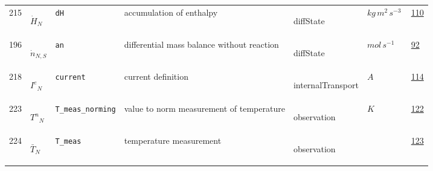 \begin{longtable}{|p{1cm}|p{2.5cm}|p{4.5cm}|p{8cm}|p{3.0cm}|p{3cm}|p{1cm}|}
            215
             & \hypertarget{"v:215"}{ $ {{\dot{H}}}{_{N}} $}
             & \verb|dH|
             & accumulation of enthalpy
             & \begin{lay}diffState \end{lay}
             & $ kg \,m^{2} \,s^{-3} \, $
             &                 \hyperlink{"e:110"}{ 110 }
                 \\
            196
             & \hypertarget{"v:196"}{ $ {{\dot{n}}}{_{N, S}} $}
             & \verb|an|
             & differential mass balance without reaction
             & \begin{lay}diffState \end{lay}
             & $ mol \,s^{-1} \, $
             &                 \hyperlink{"e:92"}{ 92 }
                 \\
            218
             & \hypertarget{"v:218"}{ $ {{I^e}}{_{N}} $}
             & \verb|current|
             & current definition
             & \begin{lay}internalTransport \end{lay}
             & $ A \, $
             &                 \hyperlink{"e:114"}{ 114 }
                 \\
            223
             & \hypertarget{"v:223"}{ $ {{T^n}}{_{N}} $}
             & \verb|T_meas_norming|
             & value to norm measurement of temperature
             & \begin{lay}observation \end{lay}
             & $ K \, $
             &                 \hyperlink{"e:122"}{ 122 }
                 \\
            224
             & \hypertarget{"v:224"}{ $ {{\bar{T}}}{_{N}} $}
             & \verb|T_meas|
             & temperature measurement
             & \begin{lay}observation \end{lay}
             & $  $
             &                 \hyperlink{"e:123"}{ 123 }
                 \\
    \end{longtable}